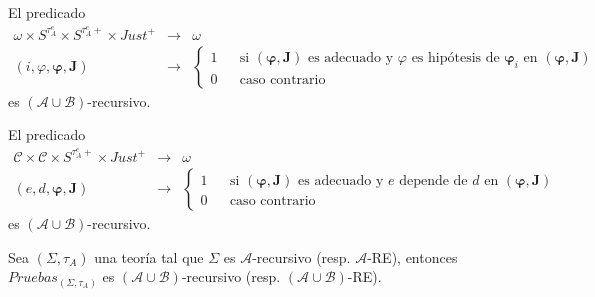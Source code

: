   \begin{lemma} \label{lemma_110}
    \PN El predicado
    \[
      \begin{array}{rcl}
        \omega \times S^{\tau_{A}^{e}} \times S^{\tau_{A}^{e}+} \times Just^{+} &\rightarrow& \omega \\
        (i, \varphi, \mathbf{\varphi}, \mathbf{J}) &\rightarrow& \left\{
          \begin{array}{ccl}
            1 && \text{si }(\mathbf{\varphi}, \mathbf{J}) \text{ es adecuado y } \varphi \text{ es hipótesis de }
              \mathbf{\varphi}_{i} \text{ en }(\mathbf{\varphi}, \mathbf{J}) \\
            0 && \text{caso contrario}
          \end{array}\right.
      \end{array}
    \]
    \PN es $(\mathcal{A} \cup \mathcal{B})$-recursivo.
  \end{lemma}

  \begin{lemma} \label{lemma_111}
    \PN El predicado
    \[
      \begin{array}{rcl}
        \mathcal{C} \times \mathcal{C} \times S^{\tau_{A}^{e}+} \times Just^{+} &\rightarrow& \omega \\
        (e, d, \mathbf{\varphi}, \mathbf{J}) &\rightarrow& \left\{
          \begin{array}{ccl}
            1 && \text{si }(\mathbf{\varphi}, \mathbf{J}) \text{ es adecuado y } e \text{ depende de } d \text{ en }
              (\mathbf{\varphi}, \mathbf{J}) \\
            0 && \text{caso contrario}
          \end{array}\right.
      \end{array}
    \]
    \PN es $(\mathcal{A} \cup \mathcal{B})$-recursivo.
  \end{lemma}

  \begin{lemma} \label{lemma_112}
    \PN Sea $(\Sigma, \tau_{A})$ una teoría tal que $\Sigma$ es $\mathcal{A}$-recursivo (resp. $\mathcal{A}$-RE),
    entonces $Pruebas_{(\Sigma, \tau_{A})}$ es $(\mathcal{A} \cup \mathcal{B})$-recursivo (resp. $(\mathcal{A} \cup
    \mathcal{B})$-RE).
  \end{lemma}

